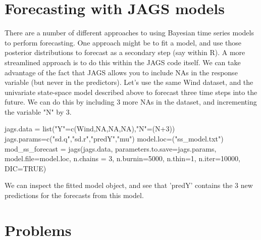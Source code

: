 \section{Forecasting with JAGS models}\label{sec:forecast}
There are a number of different approaches to using Bayesian time series models to perform forecasting. One approach might be to fit a model, and use those posterior distributions to forecast as a secondary step (say within R). A more streamlined approach is to do this within the JAGS code itself. We can take advantage of the fact that JAGS allows you to include NAs in the response variable (but never in the predictors). Let's use the same Wind dataset, and the univariate state-space model described above to forecast three time steps into the future. We can do this by including 3 more NAs in the dataset, and incrementing the variable "N" by 3.

\begin{Schunk}
\begin{Sinput}
 jags.data = list("Y"=c(Wind,NA,NA,NA),"N"=(N+3))
 jags.params=c("sd.q","sd.r","predY","mu")
 model.loc=("ss_model.txt")
 mod_ss_forecast = jags(jags.data, parameters.to.save=jags.params,
       model.file=model.loc, n.chains = 3, n.burnin=5000, n.thin=1,
       n.iter=10000, DIC=TRUE)
\end{Sinput}
\end{Schunk}

We can inspect the fitted model object, and see that 'predY' contains the 3 new predictions for the forecasts from this model. 


\clearpage
\renewcommand{\rightmark}{}
\section*{Problems}


